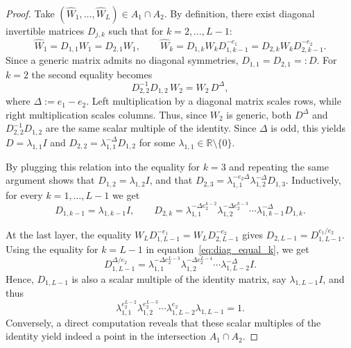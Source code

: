 \documentclass{article} %
\def\eqref#1{equation~\ref{#1}}
\theoremstyle{plain}%
\theoremstyle{definition}
\theoremstyle{remark}
\begin{document}
\begin{proof}
Take $(\widehat W_1,\dots,\widehat W_L)\in A_1\cap A_2$.  
By definition, there exist diagonal invertible matrices $D_{j,k}$ such that for $k=2, \ldots, L-1$:
\begin{equation}
\widehat W_1=D_{1,1}W_1=D_{2,1}W_1,\qquad
\widehat W_k=D_{1,k}W_kD_{1,k-1}^{-e_1}=D_{2,k}W_kD_{2,k-1}^{-e_2}.
\end{equation}
Since a generic matrix admits no diagonal symmetries, $D_{1,1}=D_{2,1}=:D$.  
For $k=2$ the second equality becomes
\begin{equation}
D_{2,2}^{-1}D_{1,2}\,W_2=W_2\,D^{\Delta},
\end{equation}
where $\Delta:=e_1-e_2$.
Left multiplication by a diagonal matrix scales rows, while right multiplication scales columns. Thus, since $W_2$ is generic, both $D^{\Delta}$ and $D_{2,2}^{-1}D_{1,2}$ are the same scalar multiple of the identity.  Since $\Delta$ is odd, this yields $D=\lambda_{1,1}I$ and $D_{2,2}=\lambda_{1,1}^{-\Delta}D_{1,2}$ for some $\lambda_{1,1} \in \mathbb{R} \setminus \{ 0 \}$.

By plugging this relation into the equality for $k=3$ and repeating the same argument shows that $D_{1,2}=\lambda_{1,2}I$, and that  
$D_{2,3}=\lambda_{1,1}^{-e_2\Delta}\lambda_{1,2}^{-\Delta}D_{1,3}$.  
Inductively, for every $k=1, \ldots, L-1$ we get
\begin{equation}
    \label{eq:diag_equal_k}
    D_{1,k-1}=\lambda_{1,k-1}I,\qquad
D_{2,k}=\lambda_{1,1}^{-\Delta e_2^{k-2}}
\lambda_{1,2}^{-\Delta e_2^{k-3} }
\cdots
\lambda_{1,k-1}^{-\Delta}D_{1,k}.
\end{equation}

At the last layer, the equality  
$W_LD_{1,L-1}^{-e_1}=W_LD_{2,L-1}^{-e_2}$ gives $D_{2,L-1}=D_{1,L-1}^{e_1/e_2}$. Using the equality for $k=L-1$ in \eqref{eq:diag_equal_k}, we get
\begin{equation}
D_{1,L-1}^{\Delta/e_2}=
\lambda_{1,1}^{-\Delta e_2^{L-3}}
\lambda_{1,2}^{-\Delta e_2^{L-4} }
\cdots
\lambda_{1,L-2}^{-\Delta} I.
\end{equation}
Hence, $D_{1,L-1}$ is also a scalar multiple of the identity matrix, say $\lambda_{1,L-1}I$, and thus
\begin{equation}
\lambda_{1,1}^{e_2^{L-2}}
\lambda_{1,2}^{ e_2^{L-3} }
\cdots
\lambda_{1,L-2}^{e_2} \lambda_{1,L-1}=1.
\end{equation}
Conversely, a direct computation reveals that these scalar multiples of the identity yield indeed a point in the intersection $A_1 \cap A_2$.
\end{proof}
\end{document}
